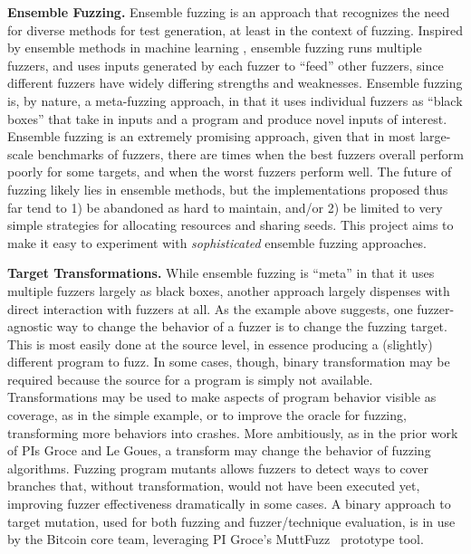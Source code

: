 \vspace{1ex}
\noindent\textbf{Ensemble Fuzzing.}   Ensemble fuzzing \cite{chen2019enfuzz,ensemble,pastis} is an 
approach that recognizes the need for
diverse methods for test generation, at least in the context of
fuzzing.   Inspired by ensemble methods in machine learning 
\cite{dietterich2002ensemble},
ensemble fuzzing runs multiple fuzzers, and uses inputs generated by
each fuzzer to ``feed'' other fuzzers, since different fuzzers have widely 
differing strengths and weaknesses. Ensemble fuzzing is, by nature, a 
meta-fuzzing approach, in that it uses individual fuzzers as ``black boxes'' 
that take in inputs and a program and produce novel inputs of interest.  
Ensemble fuzzing is an extremely promising approach, given that in most 
large-scale benchmarks of fuzzers, there are times when the best fuzzers 
overall perform poorly for some targets, and when the worst fuzzers perform 
well.  The future of fuzzing likely lies in ensemble methods, but the 
implementations proposed thus far tend to 1) be abandoned as hard to
maintain, and/or 2)  be limited to very simple strategies for 
allocating resources and sharing seeds. This
project aims to make it easy to 
experiment with \emph{sophisticated} ensemble fuzzing approaches.

\vspace{1ex}
\noindent\textbf{Target Transformations.}  While ensemble fuzzing is ``meta'' in that 
it uses multiple fuzzers largely as black boxes, another approach largely 
dispenses with direct interaction with fuzzers at all.  As the example above 
suggests, one fuzzer-agnostic way to change the behavior of a fuzzer is to 
change the fuzzing target.  This is most easily done at the source 
level, in essence producing a (slightly) different program to fuzz.  In some 
cases, though, binary transformation may be required because the
source for a program is simply not available.   Transformations may be used to make aspects of 
program behavior visible as coverage, as in the simple example, or to 
improve the oracle for fuzzing, transforming more behaviors into 
crashes.  More ambitiously, as in the prior work of PIs Groce and Le Goues, a 
transform may change the behavior of fuzzing algorithms.  Fuzzing program 
mutants allows fuzzers to detect ways to cover branches that, without 
transformation, would not have been executed yet, improving fuzzer 
effectiveness dramatically in some cases.  A binary approach to target
mutation, used for both fuzzing and fuzzer/technique evaluation, is in
use by the Bitcoin core team, leveraging PI Groce's MuttFuzz~\cite{muttfuzz} prototype tool.

